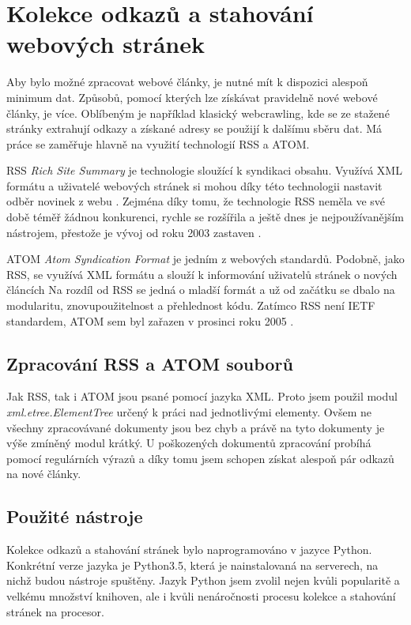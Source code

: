 \chapter{Kolekce odkazů a stahování webových stránek} %
Aby bylo možné zpracovat webové články, je nutné mít k dispozici alespoň minimum dat. Způsobů, pomocí kterých lze získávat pravidelně nové webové
články, je více. Oblíbeným je například klasický webcrawling, kde se ze stažené stránky extrahují odkazy a
získané adresy se použijí k dalšímu sběru dat. Má práce se zaměřuje hlavně na využití technologií RSS a ATOM.

RSS \textit{Rich Site Summary} je technologie sloužící k syndikaci obsahu. Využívá XML formátu a uživatelé
webových stránek si mohou díky této technologii nastavit odběr novinek z webu \cite{RSS}. Zejména díky tomu, že technologie RSS neměla ve
své době téměř žádnou konkurenci, rychle se rozšířila a ještě dnes je nejpoužívanějším nástrojem, přestože je vývoj od roku 2003
zastaven \cite{ATOM_VS_RSS}.

ATOM \textit{Atom Syndication Format} je jedním z webových standardů. Podobně, jako RSS, se využívá XML formátu a slouží k
informování uživatelů stránek o nových článcích \cite{ATOM} Na rozdíl od RSS se jedná o mladší formát a už od začátku se dbalo na
modularitu, znovupoužitelnost a přehlednost kódu. Zatímco RSS není IETF standardem, ATOM sem byl zařazen v prosinci roku 2005 \cite{ATOM_VS_RSS}.

\section{Zpracování RSS a ATOM souborů}
Jak RSS, tak i ATOM jsou psané pomocí jazyka XML. Proto jsem použil modul \textit{xml.etree.ElementTree} určený k práci nad jednotlivými
elementy. Ovšem ne všechny zpracovávané dokumenty jsou bez chyb a právě na tyto dokumenty je výše zmíněný modul krátký. U poškozených
dokumentů zpracování probíhá pomocí regulárních výrazů a díky tomu jsem schopen získat alespoň pár odkazů na nové články.

\section{Použité nástroje}
Kolekce odkazů a stahování stránek bylo naprogramováno v jazyce Python. Konkrétní verze jazyka je Python3.5, která je nainstalovaná na serverech,
na nichž budou nástroje spuštěny. Jazyk Python jsem zvolil nejen kvůli popularitě a velkému množství knihoven, ale i kvůli nenáročnosti
procesu kolekce a stahování stránek na procesor.

